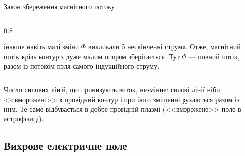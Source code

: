\documentclass[onlytextwidth]{beamer}
\begin{document}
\begin{frame}{Закон збереження магнітного потоку}{}
\begin{columns}
\begin{column}{0.8\linewidth}
\begin{block}{}
				інакше навіть малі зміни $\Phi$ викликали б нескінченні струми. Отже, \alert{магнітний потік крізь контур з дуже малим опором
					зберігається}. Тут $\Phi$ --- повний потік, разом із потоком поля самого індукційного струму.
			\end{block}
		\end{column}
	\end{columns}
	\begin{block}{}\justifying
		Число силових ліній, що пронизують виток, незмінне: силові лінії ніби <<вморожені>> в провідний контур і при його зміщенні рухаються разом
		із ним. Те саме відбувається в добре провідній плазмі (<<вморожене>> поле в астрофізиці).
	\end{block}
\end{frame}




\subsection{Вихрове електричне поле}
\end{document}

